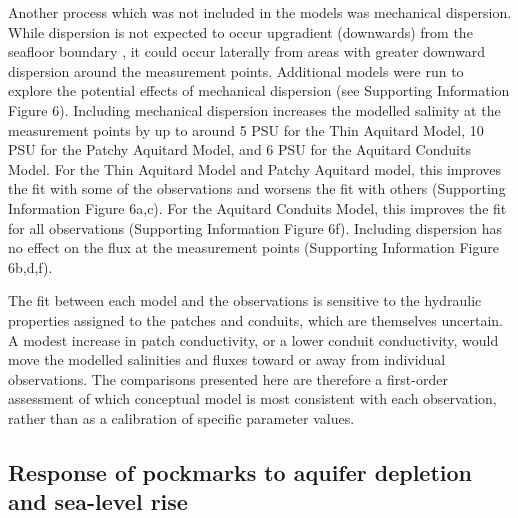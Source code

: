 \documentclass[pdflatex,sn-apa]{sn-jnl}%
\begin{document}
Another process which was not included in the models was mechanical dispersion.
While dispersion is not expected to occur upgradient (downwards) from the seafloor boundary \citep{irvine_upstream_2021},
it could occur laterally from areas with greater downward dispersion around the measurement points.
Additional models were run to explore the potential effects of mechanical dispersion (see Supporting Information Figure 6).
Including mechanical dispersion increases the modelled salinity at the measurement points by up to around 5 PSU for the Thin Aquitard Model,
10 PSU for the Patchy Aquitard Model, and 6 PSU for the Aquitard Conduits Model.
For the Thin Aquitard Model and Patchy Aquitard model, this improves the fit with some of the observations and worsens the fit with others (Supporting Information Figure 6a,c).
For the Aquitard Conduits Model, this improves the fit for all observations (Supporting Information Figure 6f).
Including dispersion has no effect on the flux at the measurement points (Supporting Information Figure 6b,d,f).

The fit between each model and the observations is sensitive to the hydraulic properties assigned to the patches and conduits, which are themselves uncertain.
A modest increase in patch conductivity, or a lower conduit conductivity, would move the modelled salinities and fluxes toward or away from individual observations.
The comparisons presented here are therefore a first-order assessment of which conceptual model is most consistent with each observation,
rather than as a calibration of specific parameter values.

\subsection{Response of pockmarks to aquifer depletion and sea-level rise}
\end{document}
